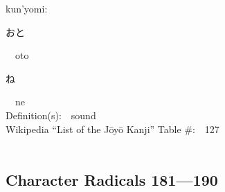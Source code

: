 \begin{multicols}{2}
{\hspace*{1em}}kun'yomi:\ \ \\
{\hspace*{2em}}{\begin{CJK}{UTF8}{min} おと \end{CJK}}\ \ oto\ \ \\
{\hspace*{2em}}{\begin{CJK}{UTF8}{min} ね \end{CJK}}\ \ ne\ \ \\
Definition(s):\ \ sound \\
Wikipedia ``List of the J\=oy\=o Kanji'' Table \#:\ \ 127 \\
\ \ \\
\end{multicols}



\newpage



\subsection*{Character Radicals 181---190 }
  \label{P3-S20}

